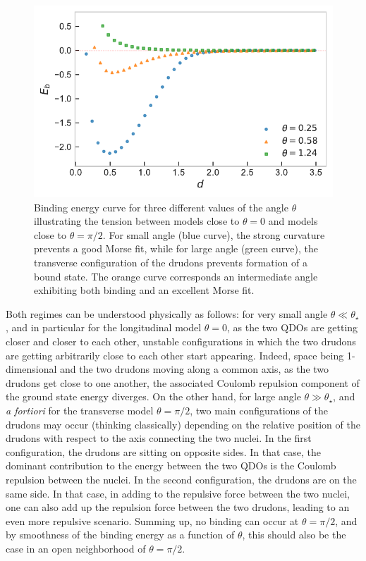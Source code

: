 \documentclass[reprint, amsmath, amssymb, floatfix, aps, pra]{revtex4-2}
\begin{document}
    \begin{figure}
        \includegraphics[scale=0.75]{figures/binding_vs_smooth.pdf}
        \caption{\label{fig:binding_vs_smooth}Binding energy curve for three different values of the angle $\theta$ illustrating the tension between models close to $\theta=0$ and models close to $\theta=\pi/2$. For small angle (blue curve),  the strong curvature prevents a good Morse fit, while for large angle (green curve), the transverse configuration of the drudons prevents formation of a bound state. The orange curve corresponds an intermediate angle exhibiting both binding and an excellent Morse fit.}
    \end{figure}

    Both regimes can be understood physically as follows: for very small angle $\theta\ll \theta_\star$, and in particular for the longitudinal model $\theta=0$, as the two QDOs are getting closer and closer to each other, unstable configurations in which the two drudons are getting arbitrarily close to each other start appearing. Indeed, space being 1-dimensional and the two drudons moving along a common axis, as the two drudons get close to one another, the associated Coulomb repulsion component of the ground state energy diverges. On the other hand, for large angle $\theta\gg \theta_\star$, and \textit{a fortiori} for the transverse model $\theta=\pi/2$, two main configurations of the drudons may occur (thinking classically) depending on the relative position of the drudons with respect to the axis connecting the two nuclei. In the first configuration, the drudons are sitting on opposite sides. In that case, the dominant contribution to the energy between the two QDOs is the Coulomb repulsion between the nuclei. In the second configuration, the drudons are on the same side. In that case, in adding to the repulsive force between the two nuclei, one can also add up the repulsion force between the two drudons, leading to an even more repulsive scenario. Summing up, no binding can occur at $\theta=\pi/2$, and by smoothness of the binding energy as a function of $\theta$, this should also be the case in an open neighborhood of $\theta=\pi/2$.
\end{document}
